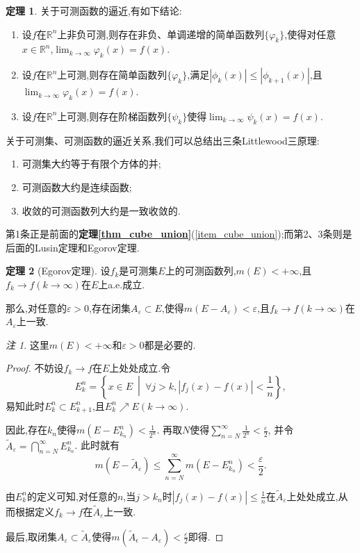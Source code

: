 \documentclass{ctexart}
\theoremstyle{definition}
\newtheorem{theorem}{定理}
\theoremstyle{remark}
\newtheorem*{remark}{注}
\begin{document}
	\begin{theorem}\label{thm_step_approx}
		关于可测函数的逼近,有如下结论:
		\begin{enumerate}
			\item 设$f$在$\mathbb{R}^n$上非负可测,则存在非负、单调递增的简单函数列$\{\varphi_k\}$,使得对任意$x\in\mathbb{R}^n$,$\lim_{k\to\infty}{\varphi_k(x)}=f(x)$.
			\item 设$f$在$\mathbb{R}^n$上可测,则存在简单函数列$\{\varphi_k\}$,满足$|\phi_k(x)|\le|\phi_{k+1}(x)|$,且$\lim_{k\to\infty}{\varphi_k(x)}=f(x)$.
			\item\label{item_step_approx} 设$f$在$\mathbb{R}^n$上可测,则存在阶梯函数列$\{\psi_k\}$使得$\lim_{k\to\infty}{\psi_k(x)}=f(x)$.
		\end{enumerate}
	\end{theorem}
	
	\hspace*{\fill}
	
	关于可测集、可测函数的逼近关系,我们可以总结出三条Littlewood三原理:
	
	\begin{enumerate}
		\item 可测集大约等于有限个方体的并;
		\item 可测函数大约是连续函数;
		\item 收敛的可测函数列大约是一致收敛的.
	\end{enumerate}
	
	第1条正是前面的\textbf{定理\ref{thm_cube_union}}(\ref{item_cube_union});而第2、3条则是后面的Lusin定理和Egorov定理.
	
	\begin{theorem}[Egorov定理]
		设$f_k$是可测集$E$上的可测函数列,$m(E)<+\infty$,且$f_k\to f(k\to\infty)$在$E$上a.e.成立.
		
		那么,对任意的$\varepsilon>0$,存在闭集$A_\varepsilon\subset E$,使得$m(E-A_\varepsilon)<\varepsilon$,且$f_k\to f(k\to\infty)$在$A_\varepsilon$上一致.
	\end{theorem}
	\begin{remark}
		这里$m(E)<+\infty$和$\varepsilon>0$都是必要的.
	\end{remark}
	\begin{proof}
		不妨设$f_k\to f$在$E$上处处成立.令
		$$E_k^n=\left\{x\in E\ \middle|\ \forall j>k,|f_j(x)-f(x)|<\frac{1}{n}\right\},$$
		易知此时$E_k^n\subset E_{k+1}^n$,且$E_k^n\nearrow E(k\to\infty)$.
		
		因此,存在$k_n$使得$m(E-E_{k_n}^n)<\frac{1}{2^n}$.
		再取$N$使得$\sum_{n=N}^\infty{\frac{1}{2^n}}<\frac{\varepsilon}{2}$,
		并令$\widetilde{A}_\varepsilon=\bigcap_{n=N}^\infty{E_{k_n}^n}$.
		此时就有
		$$m(E-\widetilde{A}_\varepsilon)\le\sum_{n=N}^\infty{m(E-E_{k_n}^n)}<\frac{\varepsilon}{2}.$$
		
		由$E_k^n$的定义可知,对任意的$n$,当$j>k_n$时$|f_j(x)-f(x)|\le\frac{1}{n}$在$\widetilde{A}_\varepsilon$上处处成立,从而根据定义$f_k\to f$在$\widetilde{A}_\varepsilon$上一致.
		
		最后,取闭集$A_\varepsilon\subset\widetilde{A}_\varepsilon$使得$m(\widetilde{A}_\epsilon-A_\varepsilon)<\frac{\varepsilon}{2}$即得.
	\end{proof}
	
\end{document}
